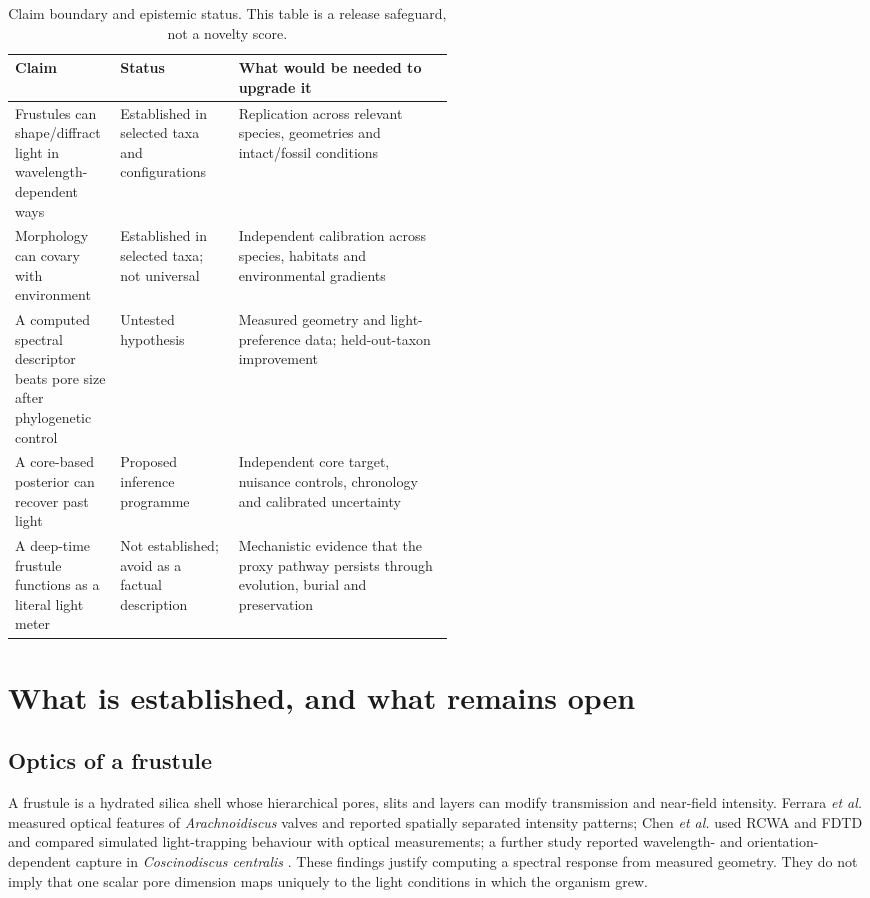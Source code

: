\documentclass[11pt,a4paper]{article}
\begin{document}
\begin{table}[H]
\caption{Claim boundary and epistemic status. This table is a release safeguard, not a novelty score.}
\label{tab:claims}
\small\begin{tabularx}{\linewidth}{@{}p{0.24\linewidth}p{0.27\linewidth}X@{}}
\toprule
Claim & Status & What would be needed to upgrade it \\
\midrule
Frustules can shape/diffract light in wavelength-dependent ways & Established in selected taxa and configurations & Replication across relevant species, geometries and intact/fossil conditions \\
Morphology can covary with environment & Established in selected taxa; not universal & Independent calibration across species, habitats and environmental gradients \\
A computed spectral descriptor beats pore size after phylogenetic control & Untested hypothesis & Measured geometry and light-preference data; held-out-taxon improvement \\
A core-based posterior can recover past light & Proposed inference programme & Independent core target, nuisance controls, chronology and calibrated uncertainty \\
A deep-time frustule functions as a literal light meter & Not established; avoid as a factual description & Mechanistic evidence that the proxy pathway persists through evolution, burial and preservation \\
\bottomrule
\end{tabularx}
\end{table}

\section{What is established, and what remains open}
\subsection{Optics of a frustule}
A frustule is a hydrated silica shell whose hierarchical pores, slits and layers can modify transmission and near-field intensity. Ferrara \textit{et al.} measured optical features of \textit{Arachnoidiscus} valves and reported spatially separated intensity patterns; Chen \textit{et al.} used RCWA and FDTD and compared simulated light-trapping behaviour with optical measurements; a further study reported wavelength- and orientation-dependent capture in \textit{Coscinodiscus centralis} \citep{ferrara2014,chen2015,romann2015}. These findings justify computing a spectral response from measured geometry. They do not imply that one scalar pore dimension maps uniquely to the light conditions in which the organism grew.
\end{document}

